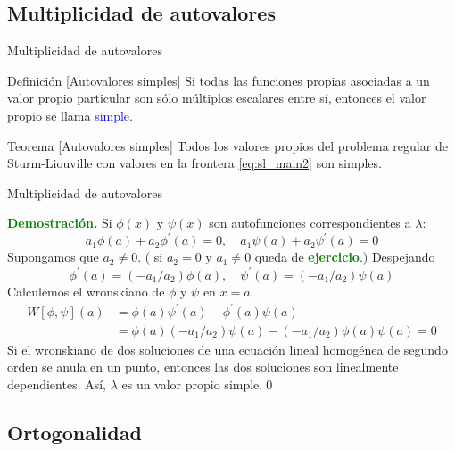 \documentclass[xcolor=dvipsnames,a4paper,10pt,handout]{beamer}
\renewcommand{\emph}[1]{\textcolor{blue}{#1}}
\renewcommand{\textbf}[1]{\textcolor{green}{\bfseries #1}}
\begin{document}
\subsection{Multiplicidad de autovalores}

\begin{frame}{Multiplicidad de autovalores}

\onslide<+->
\begin{block}{Definición [Autovalores simples]} Si todas las funciones propias asociadas a un valor propio particular son sólo múltiplos escalares entre sí, entonces el valor propio se llama \emph{simple}.
\end{block}

\onslide<+->
\begin{block}{Teorema [Autovalores simples]}
Todos los valores propios del problema regular de Sturm-Liouville con valores en la frontera \eqref{eq:sl_main2} son simples.
\end{block}
\end{frame}


\begin{frame}{Multiplicidad de autovalores}

\textbf{Demostración.} Si $\phi(x)$ y $\psi(x)$ son autofunciones  correspondientes a $\lambda$: 
$$
a_{1} \phi(a)+a_{2} \phi^{\prime}(a)=0, \quad a_{1} \psi(a)+a_{2} \psi^{\prime}(a)=0
$$
Supongamos que $a_{2} \neq 0$. ( si $a_{2}=0$ y $a_{1} \neq 0$ queda de \textbf{ejercicio}.) Despejando
$$
\phi^{\prime}(a)=\left(-a_{1} / a_{2}\right) \phi(a), \quad \psi^{\prime}(a)=\left(-a_{1} / a_{2}\right) \psi(a)
$$
Calculemos el wronskiano de $\phi$ y $\psi$ en $x=a$
$$
\begin{aligned}
W[\phi, \psi](a) &=\phi(a) \psi^{\prime}(a)-\phi^{\prime}(a) \psi(a) \\
&=\phi(a)\left(-a_{1} / a_{2}\right) \psi(a)-\left(-a_{1} / a_{2}\right) \phi(a) \psi(a)=0
\end{aligned}
$$
Si el wronskiano de dos soluciones de una ecuación lineal homogénea de segundo orden se anula en un punto, entonces las dos soluciones son linealmente dependientes. Así, $\lambda$ es un valor propio simple.\qed

\end{frame}

\subsection{Ortogonalidad}
\end{document}
